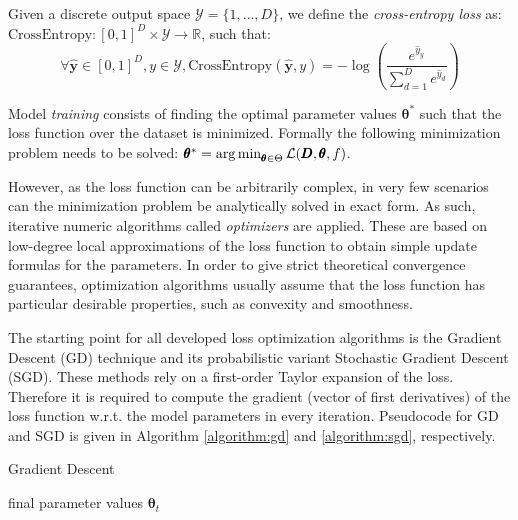\begin{definition}
Given a discrete output space $\mathcal{Y}=\{1,\dots,D\}$, we define the \emph{cross-entropy loss} as: $\text{CrossEntropy}: [0, 1]^D \times \mathcal{Y} \to \mathbb{R}$, such that:
\begin{equation}
\forall \hat{\pmb{y}} \in [0, 1]^D, y \in \mathcal{Y}, \text{CrossEntropy}(\hat{\pmb{y}},y)= - \log{\left(\frac{e^{\hat{y}_y}}{\sum_{d=1}^{D}{e^{\hat{y}_d}}}\right)}\end{equation}
\end{definition}

\begin{definition}
Model \emph{training} consists of finding the optimal parameter values $\pmb{\theta}^*$ such that the loss function over the dataset is minimized. Formally the following minimization problem needs to be solved: $\pmb{\theta}^* = \operatorname*{arg\,min}_{\pmb{\theta} \in \Theta}{\mathcal{L}(\pmb{D}, \pmb{\theta}, f)}$.
\end{definition}

However, as the loss function can be arbitrarily complex, in very few scenarios can the minimization problem be analytically solved in exact form. As such, iterative numeric algorithms called \emph{optimizers} are applied. These are based on low-degree local approximations of the loss function to obtain simple update formulas for the parameters. In order to give strict theoretical convergence guarantees, optimization algorithms usually assume that the loss function has particular desirable properties, such as convexity and smoothness.

The starting point for all developed loss optimization algorithms is the Gradient Descent (GD) technique and its probabilistic variant Stochastic Gradient Descent (SGD). These methods rely on a first-order Taylor expansion of the loss. Therefore it is required to compute the gradient (vector of first derivatives) of the loss function w.r.t. the model parameters in every iteration. Pseudocode for GD and SGD is given in Algorithm \ref{algorithm:gd} and \ref{algorithm:sgd}, respectively.

\begin{algorithm}
\caption{Gradient Descent}
\label{algorithm:gd}
\begin{algorithmic}
\ENDWHILE
\RETURN final parameter values $\pmb{\theta}_{t}$
\end{algorithmic}
\end{algorithm} 

